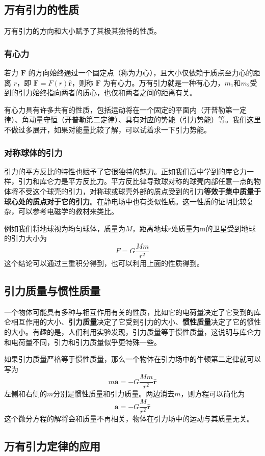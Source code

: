 \subsection{万有引力的性质}
万有引力的方向和大小赋予了其极其独特的性质。
\subsubsection{有心力}
若力 $\mathbf{F}$ 的方向始终通过一个固定点（称为力心），且大小仅依赖于质点至力心的距离 $r$，即 $\mathbf{F} = F(r) \hat{\mathbf{r}}$，则称 $\mathbf{F}$ 为有心力。万有引力就是一种有心力，$m_1$和$m_2$受到的引力始终指向两者的质心，也仅和两者之间的距离有关。

有心力具有许多共有的性质，包括运动将在一个固定的平面内（开普勒第一定律）、角动量守恒（开普勒第二定律）、具有对应的势能（引力势能）等。我们这里不做过多展开，如果对能量比较了解，可以试着求一下引力势能。
\subsubsection{对称球体的引力}
引力的平方反比的特性也赋予了它很独特的魅力。正如我们高中学到的库仑力一样，引力和库仑力是平方反比力。平方反比律导致球对称的球壳内部任意一点的物体将不受这个球壳的引力，对称球或球壳外部的质点受到的引力\textbf{等效于集中质量于球心处的质点对于它的引力}。在静电场中也有类似性质。这一性质的证明比较复杂，可以参考电磁学的教材来类比。

例如我们将地球视为均匀球体，质量为$M$，距离地球$r$处质量为m的卫星受到地球的引力大小为
\[
F = G \frac{Mm}{r^2}
\]
这个结论可以通过三重积分得到，也可以利用上面的性质得到。
\subsection{引力质量与惯性质量}
一个物体可能具有多种与相互作用有关的性质，比如它的电荷量决定了它受到的库仑相互作用的大小、\textbf{引力质量}决定了它受到引力的大小、\textbf{惯性质量}决定了它的惯性的大小。有趣的是，人们利用实验发现，引力质量等于惯性质量，这说明与库仑力和电荷量不同，引力和引力质量似乎更特殊一些。

如果引力质量严格等于惯性质量，那么一个物体在引力场中的牛顿第二定律就可以写为
\[
m \mathbf{a} = -G \frac{M m}{r^2} \hat{\mathbf{r}}
\]
左侧和右侧的$m$分别是惯性质量和引力质量。两边消去$m$，则方程可以简化为
\[
\mathbf{a} = -G \frac{M}{r^2} \hat{\mathbf{r}}
\]
这个微分方程的解将会和质量不再相关，物体在引力场中的运动与其质量无关。
\subsection{万有引力定律的应用}

